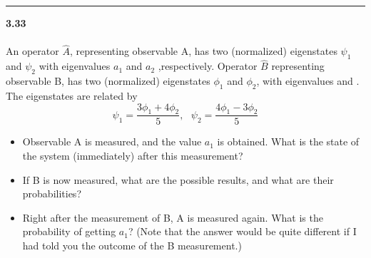 \documentclass[fleqn]{article}
\begin{document}
  \rule{15cm}{1pt}

  \textbf{3.33} \\ \\
  An operator $\hat{A}$, representing observable
  A, has two (normalized) eigenstates $\psi_1$ and $\psi_2$ with eigenvalues $a_1$ and $a_2$
  ,respectively. Operator $\hat{B}$ representing observable B, has two (normalized)
  eigenstates $\phi_1$ and $\phi_2$, with eigenvalues and . The eigenstates are related
  by
  $$\psi_1=\dfrac{3\phi_1+4\phi_2}{5}, ~~~ \psi_2=\dfrac{4\phi_1-3\phi_2}{5}$$
  \begin{itemize}
    \item Observable A is measured, and the value $a_1$ is obtained. What is the state
    of the system (immediately) after this measurement?

    \item If B is now measured, what are the possible results, and what are their
    probabilities?
    
    \item Right after the measurement of B, A is measured again. What is the
    probability of getting $a_1$? (Note that the answer would be quite different if
    I had told you the outcome of the B measurement.)
    
  \end{itemize}
\end{document}
